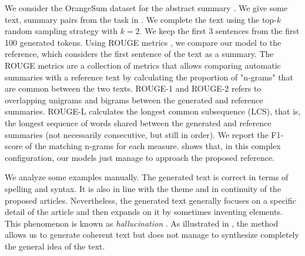 We consider the OrangeSum dataset for the abstract summary \parencite{kamal_20}. We give some text, summary pairs from the task in .
We complete the text using the top-$k$ random sampling strategy \parencite{lewis_18} with $k=2$. We keep the first 3 sentences from the first 100 generated tokens. Using ROUGE metrics \parencite{lin2004rouge}, we compare our model to the reference, which considers the first sentence of the text as a summary. The ROUGE metrics are a collection of metrics that allows comparing automatic summaries with a reference text by calculating the proportion of "n-grams" that are common between the two texts. ROUGE-1 and ROUGE-2 refers to overlapping unigrams and bigrams between the generated and reference summaries. ROUGE-L calculates the longest common subsequence (LCS), that is, the longest sequence of words shared between the generated and reference summaries (not necessarily consecutive, but still in order). We report the F1-score of the matching n-grams for each measure.  shows that, in this complex configuration, our models just manage to approach the proposed reference.

We analyze some examples manually. The generated text is correct in terms of spelling and syntax. It is also in line with the theme and in continuity of the proposed articles. Nevertheless, the generated text generally focuses on a specific detail of the article and then expands on it by sometimes inventing elements. This phenomenon is known as \textit{hallucination} \parencite{kryscinski_19}. As illustrated in , the method allows us to generate coherent text but does not manage to synthesize completely the general idea of the text.

